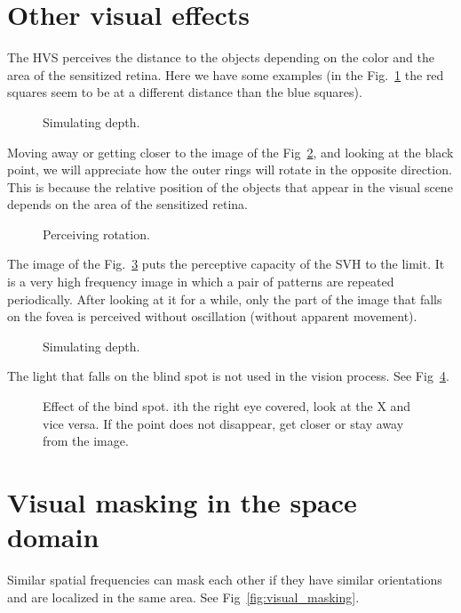 \section{Other visual effects}

The HVS perceives the distance to the objects depending on the color and the area of the sensitized retina. Here we have some examples (in the Fig.~\ref{fig:depth} the red squares seem to be at a different distance than the blue squares).

\begin{figure}
  \caption{Simulating depth.} %
  \label{fig:depth}
\end{figure}

Moving away or getting closer to the image of the Fig~\ref{fig:rotating}, and looking at the black point, we will appreciate how the outer rings will rotate in the opposite direction. This is because the relative position of the objects that appear in the visual scene depends on the area of the sensitized retina.

\begin{figure}
  \caption{Perceiving rotation.} %
  \label{fig:rotating}
\end{figure}

The image of the Fig.~\ref{fig:limit} puts the perceptive capacity of the SVH to the limit. It is a very high frequency image in which a pair of patterns are repeated periodically. After looking at it for a while, only the part of the image that falls on the fovea is perceived without oscillation (without apparent movement).

\begin{figure}
  \caption{Simulating depth.} %
  \label{fig:limit}
\end{figure}

The light that falls on the blind spot is not used in the vision process. See Fig~\ref{fig:bind_spot}.

\begin{figure}
  \caption{Effect of the bind spot. ith the right eye covered, look at the X and vice versa. If the point does not disappear, get closer or stay away from the image.} %
  \label{fig:bind_spot}
\end{figure}

\section{Visual masking in the space domain}
Similar spatial frequencies can mask each other if they have similar
orientations and are localized in the same area. See Fig~\ref{fig:visual_masking}.
  
